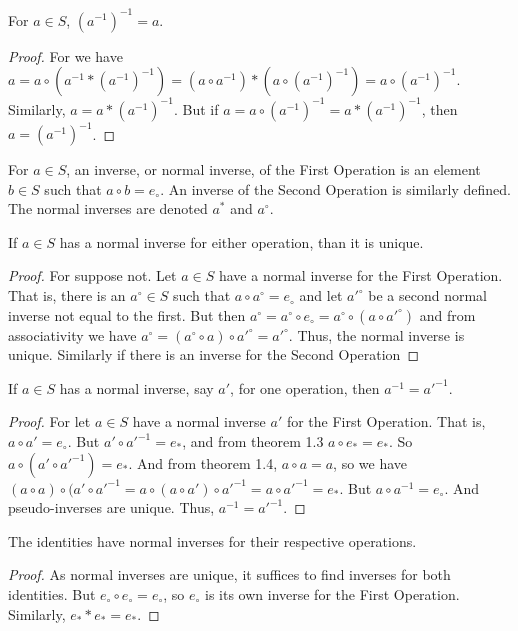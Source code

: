 \documentclass[crop=false,class=book]{standalone}
\begin{document}
\begin{theorem} For $a\in S$, $(a^{-1})^{-1} =a$.
\end{theorem}
\begin{proof} For we have $a = a\circ (a^{-1}* (a^{-1})^{-1}) = (a\circ a^{-1})*(a\circ (a^{-1})^{-1}) =a \circ (a^{-1})^{-1}$. Similarly, $a = a* (a^{-1})^{-1}$. But if $a = a\circ (a^{-1})^{-1} = a*(a^{-1})^{-1}$, then $a = (a^{-1})^{-1}$.
\end{proof}
\begin{definition} For $a\in S$, an inverse, or normal inverse, of the First Operation is an element $b\in S$ such that $a\circ b=e_{\circ}$. An inverse of the Second Operation is similarly defined. The normal inverses are denoted $a^{*}$ and $a^{\circ}$.
\end{definition}
\begin{theorem} If $a\in S$ has a normal inverse for either operation, than it is unique.
\end{theorem}
\begin{proof} For suppose not. Let $a\in S$ have a normal inverse for the First Operation. That is, there is an $a^{\circ}\in S$ such that $a\circ a^{\circ}=e_{\circ}$ and let $a'^{\circ}$ be a second normal inverse not equal to the first. But then $a^{\circ}=a^{\circ}\circ e_{\circ}=a^{\circ}\circ (a\circ a'^{\circ})$ and from associativity we have $a^{\circ}=(a^{\circ}\circ a)\circ a'^{\circ}=a'^{\circ}$. Thus, the normal inverse is unique. Similarly if there is an inverse for the Second Operation
\end{proof}
\begin{theorem} If $a\in S$ has a normal inverse, say $a'$, for one operation, then $a^{-1}=a'^{-1}$.
\end{theorem}
\begin{proof} For let $a\in S$ have a normal inverse $a'$ for the First Operation. That is, $a\circ a' = e_{\circ}$. But $a' \circ a'^{-1}=e_{*}$, and from theorem 1.3 $a\circ e_{*}=e_{*}$. So $a\circ (a' \circ a'^{-1})=e_{*}$. And from theorem 1.4, $a\circ a=a$, so we have $(a\circ a)\circ (a'\circ a'^{-1}=a\circ (a\circ a')\circ a'^{-1}=a\circ a'^{-1}=e_{*}$. But $a\circ a^{-1}=e_{\circ}$. And pseudo-inverses are unique. Thus, $a^{-1}=a'^{-1}$. 
\end{proof}
\begin{theorem} The identities have normal inverses for their respective operations.
\end{theorem}
\begin{proof} As normal inverses are unique, it suffices to find inverses for both identities. But $e_{\circ}\circ e_{\circ}=e_{\circ}$, so $e_{\circ}$ is its own inverse for the First Operation. Similarly, $e_{*}*e_{*}=e_{*}$.
\end{proof}
\end{document}
